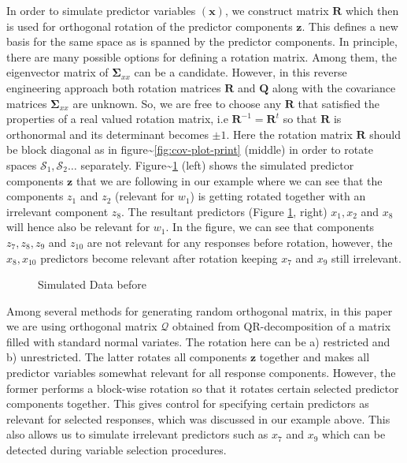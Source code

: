 \documentclass[3p,times,12pt,authoryear]{elsarticle}
\theoremstyle{definition}
\theoremstyle{definition}
\theoremstyle{remark}
\begin{document}
In order to simulate predictor variables \((\mathbf{x})\), we construct
matrix \(\mathbf{R}\) which then is used for orthogonal rotation of the
predictor components \(\mathbf{z}\). This defines a new basis for the
same space as is spanned by the predictor components. In principle,
there are many possible options for defining a rotation matrix. Among
them, the eigenvector matrix of \(\boldsymbol{\Sigma}_{xx}\) can be a
candidate. However, in this reverse engineering approach both rotation
matrices \(\mathbf{R}\) and \(\mathbf{Q}\) along with the covariance
matrices \(\boldsymbol{\Sigma}_{xx}\) are unknown. So, we are free to
choose any \(\mathbf{R}\) that satisfied the properties of a real valued
rotation matrix, i.e \(\mathbf{R}^{-1} = \mathbf{R}^t\) so that
\(\mathbf{R}\) is orthonormal and its determinant becomes \(\pm 1\).
Here the rotation matrix \(\mathbf{R}\) should be block diagonal as in
figure\textasciitilde{}\ref{fig:cov-plot-print} (middle) in order to
rotate spaces \(\mathcal{S}_1, \mathcal{S}_2 \ldots\) separately.
Figure\textasciitilde{}\ref{fig:simulated-data} (left) shows the
simulated predictor components \(\mathbf{z}\) that we are following in
our example where we can see that the components \(z_{1}\) and \(z_{2}\)
(relevant for \(w_1\)) is getting rotated together with an irrelevant
component \(z_{8}\). The resultant predictors (Figure
\ref{fig:simulated-data}, right) \(x_{1}, x_{2}\) and \(x_{8}\) will
hence also be relevant for \(w_1\). In the figure, we can see that
components \(z_{7}, z_{8}, z_{9}\) and \(z_{10}\) are not relevant for
any responses before rotation, however, the \(x_{8}, x_{10}\) predictors
become relevant after rotation keeping \(x_{7}\) and \(x_{9}\) still
irrelevant.

\begin{figure}[!htb]

{\centering {}

}

\caption{Simulated Data before}\label{fig:simulated-data}
\end{figure}

Among several methods
\citep{anderson1987generation, heiberger1978algorithm} for generating
random orthogonal matrix, in this paper we are using orthogonal matrix
\(\mathcal{Q}\) obtained from QR-decomposition of a matrix filled with
standard normal variates. The rotation here can be a) restricted and b)
unrestricted. The latter rotates all components \(\mathbf{z}\) together
and makes all predictor variables somewhat relevant for all response
components. However, the former performs a block-wise rotation so that
it rotates certain selected predictor components together. This gives
control for specifying certain predictors as relevant for selected
responses, which was discussed in our example above. This also allows us
to simulate irrelevant predictors such as \(x_{7}\) and \(x_{9}\) which
can be detected during variable selection procedures.
\end{document}
